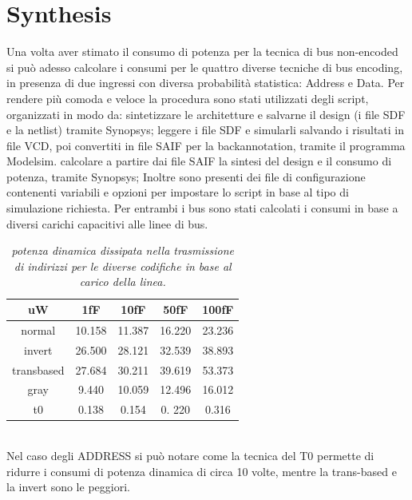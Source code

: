 \section{Synthesis}
Una volta aver stimato il consumo di potenza per la tecnica di bus non-encoded si può adesso calcolare i consumi per le quattro diverse tecniche di bus encoding, in presenza di due ingressi con diversa probabilità statistica: Address e Data.  
Per rendere più comoda e veloce la procedura sono stati utilizzati degli script, organizzati in modo da:
sintetizzare le architetture e salvarne il design (i file SDF e la netlist) tramite Synopsys;
leggere i file SDF e simularli salvando i risultati in file VCD, poi convertiti in file SAIF
per la backannotation, tramite il programma Modelsim.
calcolare a partire dai file SAIF la sintesi del design e il consumo di potenza, tramite Synopsys;
Inoltre sono presenti dei file di configurazione contenenti variabili e opzioni per impostare lo script in base al tipo di simulazione richiesta.
Per entrambi i bus sono stati calcolati i consumi in  base a diversi carichi capacitivi alle linee di bus.
\\
\begin{table}[!h]\footnotesize
	\centering
	\begin{tabular}{|c|c|c|c|c|}
		\hline
		\textbf{uW} & \textbf{1fF} & \textbf{10fF} & \textbf{50fF} & \textbf{100fF}\\
		\hline
		normal & 10.158 & 11.387 & 16.220 & 23.236\\
		invert & 26.500 & 28.121 & 32.539  & 38.893\\
		transbased & 27.684 & 30.211 & 39.619 & 53.373\\
		gray & 9.440 & 10.059 & 12.496 & 16.012\\              
		t0 & 0.138 & 0.154 & 0. 220 & 0.316\\
		\hline
	\end{tabular}
	\caption{\textit{potenza dinamica dissipata nella trasmissione di indirizzi per le diverse codifiche in base al carico della linea.}}
\label{Tab9}
\end{table}
\\
Nel caso degli ADDRESS si può notare come la tecnica del T0 permette di ridurre i consumi di potenza dinamica di circa 10 volte, mentre la trans-based e la invert sono le peggiori.
\\
